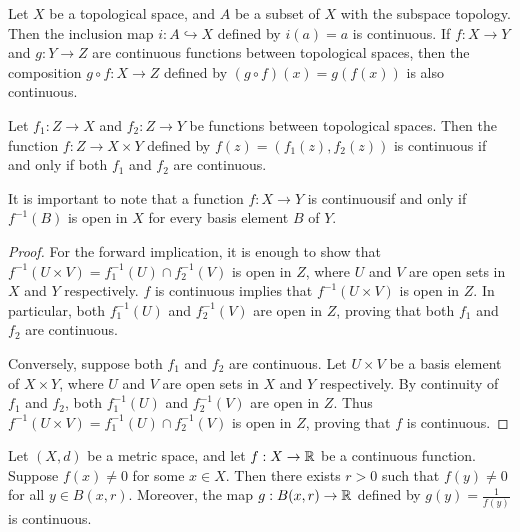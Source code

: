 Let $X$ be a topological space, and $A$ be a subset of $X$ with the subspace topology. Then the inclusion map $i : A \hookrightarrow X$ defined by $i(a) = a$ is continuous. If $f: X \to Y$ and $g : Y \to Z$ are continuous functions between topological spaces, then the composition $g \circ f : X \to Z$ defined by $(g \circ f)(x) = g(f(x))$ is also continuous.

\begin{theorem}
    Let $f_{1}:Z \to X$ and $f_{2}:Z \to Y$ be functions between topological spaces. Then the function $f : Z \to X \times Y$ defined by $f(z) = (f_{1}(z), f_{2}(z))$ is continuous if and only if both $f_{1}$ and $f_{2}$ are continuous.
\end{theorem}
It is important to note that a function $f: X \to Y$ is continuousif and only if $f^{-1}(B)$ is open in $X$ for every basis element $B$ of $Y$.
\begin{proof}
    For the forward implication, it is enough to show that $f^{-1}(U \times V) = f_{1}^{-1}(U) \cap f_{2}^{-1}(V)$ is open in $Z$, where $U$ and $V$ are open sets in $X$ and $Y$ respectively. $f$ is continuous implies that $f^{-1}(U \times V)$ is open in $Z$. In particular, both $f_{1}^{-1}(U)$ and $f_{2}^{-1}(V)$ are open in $Z$, proving that both $f_{1}$ and $f_{2}$ are continuous.

    Conversely, suppose both $f_{1}$ and $f_{2}$ are continuous. Let $U \times V$ be a basis element of $X \times Y$, where $U$ and $V$ are open sets in $X$ and $Y$ respectively. By continuity of $f_{1}$ and $f_{2}$, both $f_{1}^{-1}(U)$ and $f_{2}^{-1}(V)$ are open in $Z$. Thus $f^{-1}(U \times V) = f_{1}^{-1}(U) \cap f_{2}^{-1}(V)$ is open in $Z$, proving that $f$ is continuous.
\end{proof}

\begin{lemma}
    Let $(X,d)$ be a metric space, and let $f: X \to \mathbb{R}$ be a continuous function. Suppose $f(x) \neq 0$ for some $x \in X$. Then there exists $r > 0$ such that $f(y) \neq 0$ for all $y \in B(x,r)$. Moreover, the map $g:B(x,r) \to \mathbb{R}$ defined by $g(y) = \frac{1}{f(y)}$ is continuous.
\end{lemma}

